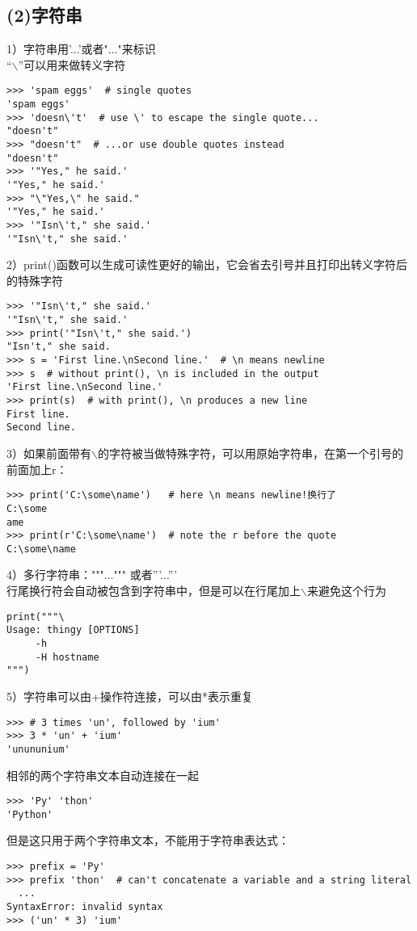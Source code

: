 \documentclass{article}
\begin{document}
\begin{CJK}{UTF8}{gbsn}
\subsection*{(2)字符串}
1）字符串用'...'或者"..."来标识\\
“$\backslash$”可以用来做转义字符
\begin{verbatim}
>>> 'spam eggs'  # single quotes
'spam eggs'
>>> 'doesn\'t'  # use \' to escape the single quote...
"doesn't"
>>> "doesn't"  # ...or use double quotes instead
"doesn't"
>>> '"Yes," he said.'
'"Yes," he said.'
>>> "\"Yes,\" he said."
'"Yes," he said.'
>>> '"Isn\'t," she said.'
'"Isn\'t," she said.'
\end{verbatim}
2）print()函数可以生成可读性更好的输出，它会省去引号并且打印出转义字符后的特殊字符
\begin{verbatim}
>>> '"Isn\'t," she said.'
'"Isn\'t," she said.'
>>> print('"Isn\'t," she said.')
"Isn't," she said.
>>> s = 'First line.\nSecond line.'  # \n means newline
>>> s  # without print(), \n is included in the output
'First line.\nSecond line.'
>>> print(s)  # with print(), \n produces a new line
First line.
Second line.
\end{verbatim}
3）如果前面带有$\backslash$的字符被当做特殊字符，可以用原始字符串，在第一个引号的前面加上r：
\begin{verbatim}
>>> print('C:\some\name')   # here \n means newline!换行了
C:\some
ame
>>> print(r'C:\some\name')  # note the r before the quote
C:\some\name
\end{verbatim}
4）多行字符串："""...""" 或者'''...'''\\
行尾换行符会自动被包含到字符串中，但是可以在行尾加上$\backslash$来避免这个行为
\begin{verbatim}
print("""\
Usage: thingy [OPTIONS]
     -h                        
     -H hostname                
""")
\end{verbatim}
5）字符串可以由+操作符连接，可以由*表示重复
\begin{verbatim}
>>> # 3 times 'un', followed by 'ium'
>>> 3 * 'un' + 'ium'
'unununium'
\end{verbatim}
相邻的两个字符串文本自动连接在一起
\begin{verbatim}
>>> 'Py' 'thon'
'Python'
\end{verbatim}
但是这只用于两个字符串文本，不能用于字符串表达式：
\begin{verbatim}
>>> prefix = 'Py'
>>> prefix 'thon'  # can't concatenate a variable and a string literal
  ...
SyntaxError: invalid syntax
>>> ('un' * 3) 'ium'

\end{verbatim}
\end{CJK}
\end{document}
